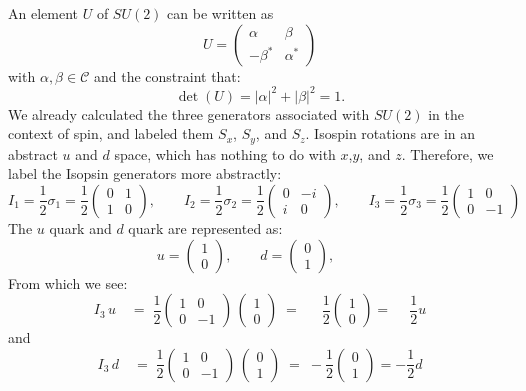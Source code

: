 \documentclass[12pt]{article}
\begin{document}
An element $U$ of $SU(2)$ can be written as
\begin{equation*}
  U =
  \begin{pmatrix} \alpha & \beta \\ -\beta^* & \alpha^* \end{pmatrix}
\end{equation*}
with $\alpha,\beta \in \mathcal{C}$ and the constraint that:
$$\det(U) = |\alpha|^2 + |\beta|^2 = 1.$$
We already calculated the three generators associated with $SU(2)$ in
the context of spin, and labeled them $S_x$, $S_y$, and $S_z$.
Isospin rotations are in an abstract $u$ and $d$ space, which has
nothing to do with $x$,$y$, and $z$.  Therefore, we label the Isopsin
generators more abstractly:
\begin{equation}
  I_1 = \frac{1}{2}\sigma_1 = \frac{1}{2}\begin{pmatrix} 0 &  1 \\ 1 &  0 \end{pmatrix}, \qquad
  I_2 = \frac{1}{2}\sigma_2 = \frac{1}{2}\begin{pmatrix} 0 & -i \\ i &  0 \end{pmatrix}, \qquad
  I_3 = \frac{1}{2}\sigma_3 = \frac{1}{2}\begin{pmatrix} 1 &  0 \\ 0 & -1 \end{pmatrix}
\end{equation}
The $u$ quark and $d$ quark are represented as:
$$ u = \begin{pmatrix} 1 \\  0 \end{pmatrix}, \qquad
d = \begin{pmatrix} 0 \\  1 \end{pmatrix}, \qquad
$$
From which we see:
$$I_3 \, u \quad = \; \frac{1}{2}\begin{pmatrix} 1 &  0 \\ 0 & -1 \end{pmatrix}
\, \begin{pmatrix} 1 \\  0 \end{pmatrix} \; = \;  
\phantom{-}\frac{1}{2} \begin{pmatrix} 1 \\  0 \end{pmatrix} = \phantom{-}\frac{1}{2} u 
$$
and 
$$I_3 \, d \quad = \; \frac{1}{2}\begin{pmatrix} 1 &  0 \\ 0 & -1 \end{pmatrix}
\, \begin{pmatrix} 0 \\  1 \end{pmatrix} \; = \; 
-\frac{1}{2} \begin{pmatrix} 0 \\  1 \end{pmatrix} = -\frac{1}{2} d 
$$
\end{document}
